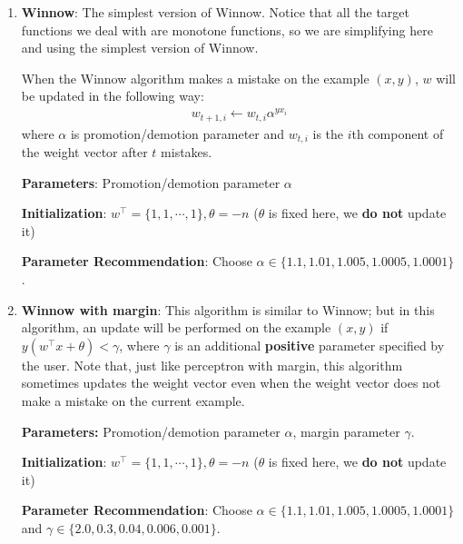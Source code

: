 \begin{enumerate}
  {\bf Parameters:} learning rate $\eta$ (to tune), fixed margin parameter $\gamma$=1.

  Given that $\gamma>0$, using a different learning rate $\eta$ will produce
  a different weight vector. The best value of $\gamma$ and the best value
  of $\eta$ are closely related given that you can scale $\gamma$ and
  $\eta$.

  {\bf Initialization}: $w^\intercal=\{0,0,\cdots,0\},\theta=0$

  {\bf Parameter Recommendation}: Choose $\eta \in \{1.5,0.25,0.03,0.005,0.001\}$.

\item {\bf Winnow}: The simplest version of Winnow. Notice that all the target functions we deal with are monotone functions, so we are simplifying here and using the simplest version of Winnow.

When the Winnow algorithm makes a mistake on the example $(x, y)$, $w$
will be updated in the following way:
\begin{align*}
w_{t+1,i} \leftarrow w_{t,i} \alpha^{yx_i}
\end{align*}
where $\alpha$ is promotion/demotion parameter and $w_{t,i}$ is the
$i$th component of the weight vector after $t$ mistakes.

  {\bf Parameters}: Promotion/demotion parameter $\alpha$
  
  {\bf Initialization}: $w^\intercal=\{1,1,\cdots,1\},\theta=-n$ ($\theta$ is fixed here, we {\bf do not} update it)

  {\bf Parameter Recommendation}: Choose $\alpha \in \{1.1,1.01,1.005,1.0005,1.0001\}$.


\item {\bf Winnow with margin}: This algorithm is similar to Winnow; but in
  this algorithm, an update will be performed on the example $(x,y)$
  if $y(w^\intercal x + \theta) < \gamma$, where $\gamma$ is an
  additional {\bf positive} parameter specified by the user. Note
  that, just like perceptron with margin, this algorithm sometimes
  updates the weight vector even when the weight vector does not make
  a mistake on the current example.

  {\bf Parameters:} Promotion/demotion parameter $\alpha$, margin parameter
  $\gamma$.

  {\bf Initialization}: $w^\intercal=\{1,1,\cdots,1\},\theta=-n$ ($\theta$ is fixed here, we {\bf do not} update it)

  {\bf Parameter Recommendation}: Choose $\alpha \in \{1.1,1.01,1.005,1.0005,1.0001\}$ and $\gamma \in \{2.0,0.3,0.04,0.006,0.001\}$.


\end{enumerate}
